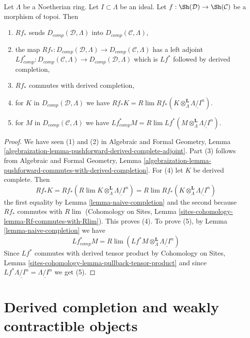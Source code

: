\begin{lemma}
\label{lemma-pushforward-Noetherian-case}
Let $\Lambda$ be a Noetherian ring. Let $I \subset \Lambda$ be an ideal.
Let $f : \Sh(\mathcal{D}) \to \Sh(\mathcal{C})$ be a morphism of topoi.
Then
\begin{enumerate}
\item $Rf_*$ sends $D_{comp}(\mathcal{D}, \Lambda)$
into $D_{comp}(\mathcal{C}, \Lambda)$,
\item the map $Rf_* : D_{comp}(\mathcal{D}, \Lambda) \to
D_{comp}(\mathcal{C}, \Lambda)$ has a left adjoint
$Lf_{comp}^* : D_{comp}(\mathcal{C}, \Lambda) \to
D_{comp}(\mathcal{D}, \Lambda)$ which is $Lf^*$ followed by
derived completion,
\item $Rf_*$ commutes with derived completion,
\item for $K$ in $D_{comp}(\mathcal{D}, \Lambda)$ we have
$Rf_*K = R\lim Rf_*(K \otimes^\mathbf{L}_\Lambda \underline{\Lambda/I^n})$.
\item for $M$ in $D_{comp}(\mathcal{C}, \Lambda)$ we have
$Lf^*_{comp}M =
R\lim Lf^*(M \otimes^\mathbf{L}_\Lambda \underline{\Lambda/I^n})$.
\end{enumerate}
\end{lemma}

\begin{proof}
We have seen (1) and (2) in
Algebraic and Formal Geometry, Lemma
\ref{algebraization-lemma-pushforward-derived-complete-adjoint}.
Part (3) follows from
Algebraic and Formal Geometry, Lemma
\ref{algebraization-lemma-pushforward-commutes-with-derived-completion}.
For (4) let $K$ be derived complete. Then
$$
Rf_*K = Rf_*( R\lim K \otimes^\mathbf{L}_\Lambda \underline{\Lambda/I^n}) =
R\lim Rf_*(K \otimes^\mathbf{L}_\Lambda \underline{\Lambda/I^n})
$$
the first equality by Lemma \ref{lemma-naive-completion}
and the second because $Rf_*$ commutes with $R\lim$
(Cohomology on Sites, Lemma
\ref{sites-cohomology-lemma-Rf-commutes-with-Rlim}). This proves (4).
To prove (5), by Lemma \ref{lemma-naive-completion} we have
$$
Lf_{comp}^*M =
R\lim ( Lf^*M \otimes_\Lambda^\mathbf{L} \underline{\Lambda/I^n})
$$
Since $Lf^*$ commutes with derived tensor product by
Cohomology on Sites, Lemma \ref{sites-cohomology-lemma-pullback-tensor-product}
and since $Lf^*\underline{\Lambda/I^n} = \underline{\Lambda/I^n}$
we get (5).
\end{proof}







\section{Derived completion and weakly contractible objects}
\label{section-derived-completion-proetale}

